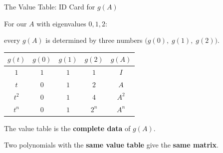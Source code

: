 \documentclass[10pt]{beamer}
\theoremstyle{definition}
\newcommand{\x}[1]{\alert{\textbf{#1}}}
\begin{document}
%
\begin{frame}{The Value Table: ID Card for $g(A)$}

For our $A$ with eigenvalues $0, 1, 2$:

every $g(A)$ is determined by three numbers $\bigl(g(0),\; g(1),\; g(2)\bigr)$.

\vfill

\begin{center}
\renewcommand{\arraystretch}{1.5}
\begin{tabular}{c|ccc|c}
$g(t)$ & $g(0)$ & $g(1)$ & $g(2)$ & $g(A)$ \\
\hline
$1$ & $1$ & $1$ & $1$ & $I$ \\
$t$ & $0$ & $1$ & $2$ & $A$ \\
$t^2$ & $0$ & $1$ & $4$ & $A^2$ \\
$t^n$ & $0$ & $1$ & $2^n$ & $A^n$
\end{tabular}
\end{center}

\vfill\pause

The value table is the \x{complete data} of $g(A)$.

\vfill

Two polynomials with the \x{same value table} give the \x{same matrix}.

\end{frame}
\end{document}
